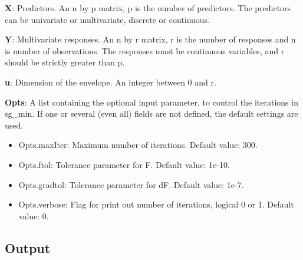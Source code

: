 \documentclass[a4paper,11pt,openany]{memoir}
\begin{document}
\begin{par}
\textbf{X}: Predictors. An n by p matrix, p is the number of predictors. The predictors can be univariate or multivariate, discrete or continuous.
\end{par} \vspace{1em}
\begin{par}
\textbf{Y}: Multivariate responses. An n by r matrix, r is the number of responses and n is number of observations. The responses must be continuous variables, and r should be strictly greater than p.
\end{par} \vspace{1em}
\begin{par}
\textbf{u}: Dimension of the envelope. An integer between 0 and r.
\end{par} \vspace{1em}
\begin{par}
\textbf{Opts}: A list containing the optional input parameter, to control the iterations in sg\_min. If one or several (even all) fields are not defined, the default settings are used.
\end{par} \vspace{1em}
\begin{itemize}
\setlength{\itemsep}{-1ex}
   \item Opts.maxIter: Maximum number of iterations.  Default value: 300.
   \item Opts.ftol: Tolerance parameter for F.  Default value: 1e-10.
   \item Opts.gradtol: Tolerance parameter for dF.  Default value: 1e-7.
   \item Opts.verbose: Flag for print out number of iterations, logical 0 or 1. Default value: 0.
\end{itemize}


\subsection*{Output}
\end{document}
